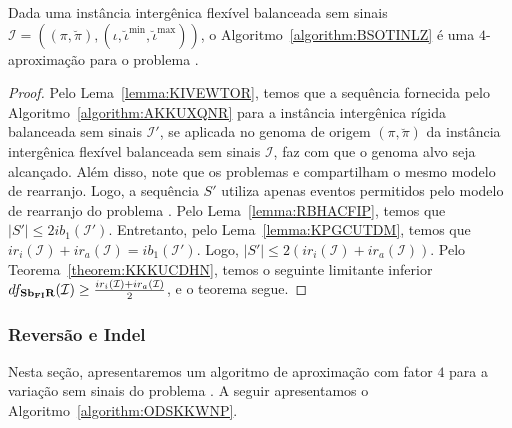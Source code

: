 

\begin{theorem}\label{theorem:WKATVVBS}
Dada uma instância intergênica flexível balanceada sem sinais $\mathcal{I} = ((\pi,\breve\pi),(\iota,\breve\iota^{\min},\breve\iota^{\max}))$, o Algoritmo~\ref{algorithm:BSOTINLZ} é uma $4$-aproximação para o problema \SbFIR{}.
\end{theorem}
\begin{proof}
Pelo Lema~\ref{lemma:KIVEWTOR}, temos que a sequência fornecida pelo Algoritmo~\ref{algorithm:AKKUXQNR} para a instância intergênica rígida balanceada sem sinais $\mathcal{I'}$, se aplicada no genoma de origem $(\pi,\breve\pi)$ da instância intergênica flexível balanceada sem sinais $\mathcal{I}$, faz com que o genoma alvo seja alcançado. Além disso, note que os problemas \SbIR{} e \SbFIR{} compartilham o mesmo modelo de rearranjo. Logo, a sequência $S'$ utiliza apenas eventos permitidos pelo modelo de rearranjo do problema \SbFIR{}. Pelo Lema~\ref{lemma:RBHACFIP}, temos que $|S'| \le 2ib_1(\mathcal{I'})$. Entretanto, pelo Lema~\ref{lemma:KPGCUTDM}, temos que $ir_i(\mathcal{I}) + ir_a(\mathcal{I}) = ib_1(\mathcal{I'})$. Logo, $|S'| \le 2(ir_i(\mathcal{I}) + ir_a(\mathcal{I}))$. Pelo Teorema~\ref{theorem:KKKUCDHN}, temos o seguinte limitante inferior $df_{\textbf{Sb\textsubscript{FI}R}}(\mathcal{I}) \ge \frac{ir_i(\mathcal{I}) + ir_a(\mathcal{I})}{2}$, e o teorema segue.
\end{proof}

\subsubsection{Reversão e Indel}

Nesta seção, apresentaremos um algoritmo de aproximação com fator $4$ para a variação sem sinais do problema \SbFIRI{}. A seguir apresentamos o Algoritmo~\ref{algorithm:ODSKKWNP}.



